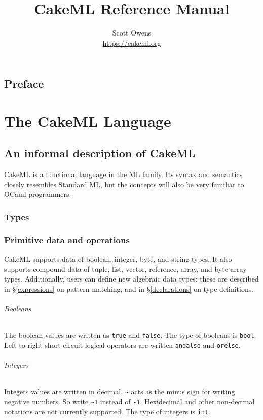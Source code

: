 \documentclass[12pt,a4paper]{book}
\title{CakeML Reference Manual}
\author{Scott Owens\\
\url{https://cakeml.org}
}
\begin{document}
\sloppy
\maketitle

\frontmatter

\chapter{Preface}



\mainmatter
\tableofcontents


\part{The CakeML Language}

\chapter{An informal description of CakeML}

CakeML is a functional language in the ML family. Its syntax and semantics closely resembles Standard ML, but the concepts will also be very familiar to OCaml programmers.

\section{Types}


\section{Primitive data and operations}

CakeML supports data of boolean, integer, byte, and string types. It also supports compound data of tuple, list, vector, reference, array, and byte array types. Additionally, users can define new algebraic data types: these are described in  \S\ref{expressions} on pattern matching, and in \S\ref{declarations} on type definitions.

\paragraph{Booleans} The boolean values are written as \texttt{true} and \texttt{false}. The type of booleans is \texttt{bool}. Left-to-right short-circuit logical operators are written \texttt{andalso} and \texttt{orelse}.

\paragraph{Integers} Integers values are written in decimal. \verb|~| acts as the minus sign for writing negative numbers. So write \verb|~1| instead of \verb|-1|. Hexidecimal and other non-decimal notations are not currently supported. The type of integers is \texttt{int}.
\end{document}
